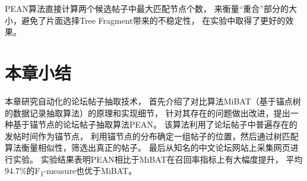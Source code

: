 PEAN算法直接计算两个候选帖子中最大匹配节点个数，
来衡量“重合”部分的大小，避免了片面选择Tree Fragment带来的不稳定性，
在实验中取得了更好的效果。

\section{本章小结}
\label{sec:pean-conclusion}

本章研究自动化的论坛帖子抽取技术，
首先介绍了对比算法MiBAT（基于锚点树的数据记录抽取算法）的原理和实现细节，
针对其存在的问题做出改进，提出一种基于锚节点的论坛帖子抽取算法PEAN。
该算法利用了论坛帖子中普遍存在的发帖时间作为锚节点，
利用锚节点的分布确定一组帖子的位置，然后通过树匹配算法衡量相似性，筛选出真正的帖子。
最后从知名的中文论坛网站上采集网页进行实验。
实验结果表明PEAN相比于MiBAT在召回率指标上有大幅度提升，
平均94.7\%的F\textsubscript{1}-measure也优于MiBAT。
